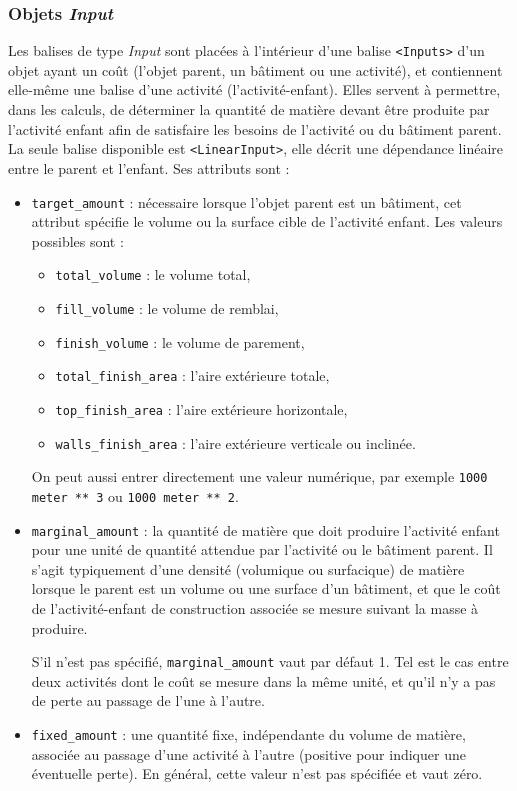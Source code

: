 \documentclass{article}
\begin{document}
\subsubsection{Objets \textit{Input}}
Les balises de type \textit{Input} sont placées à l'intérieur d'une balise \texttt{<Inputs>} d'un objet ayant un coût (l'objet parent, un bâtiment ou une activité), et contiennent elle-même une balise d'une activité (l'activité-enfant). Elles servent à permettre, dans les calculs, de déterminer la quantité de matière devant être produite par l'activité enfant afin de satisfaire les besoins de l'activité ou du bâtiment parent.
La seule balise disponible est \texttt{<LinearInput>}, elle décrit une dépendance linéaire entre le parent et l'enfant. Ses attributs sont :
\begin{itemize}
 \item \texttt{target\_amount} : nécessaire lorsque l'objet parent est un bâtiment, cet attribut spécifie le volume ou la surface cible de l'activité enfant. Les valeurs possibles sont :
 \begin{itemize}
  \item \texttt{total\_volume} : le volume total,
  \item \texttt{fill\_volume} : le volume de remblai,
  \item \texttt{finish\_volume} : le volume de parement,
  \item \texttt{total\_finish\_area} : l'aire extérieure totale,
  \item \texttt{top\_finish\_area} : l'aire extérieure horizontale,
  \item \texttt{walls\_finish\_area} : l'aire extérieure verticale ou inclinée.
 \end{itemize}
 On peut aussi entrer directement une valeur numérique, par exemple \texttt{1000 meter ** 3} ou \texttt{1000 meter ** 2}.

 
 \item \texttt{marginal\_amount} : la quantité de matière que doit produire l'activité enfant pour une unité de quantité attendue par l'activité ou le bâtiment parent. Il s'agit typiquement d'une densité (volumique ou surfacique) de matière lorsque le parent est un volume ou une surface d'un bâtiment, et que le coût de l'activité-enfant de construction associée se mesure suivant la masse à produire.
 
 S'il n'est pas spécifié, \texttt{marginal\_amount} vaut par défaut 1. Tel est le cas entre deux activités dont le coût se mesure dans la même unité, et qu'il n'y a pas de perte au passage de l'une à l'autre.
 
 \item \texttt{fixed\_amount} : une quantité fixe, indépendante du volume de matière, associée au passage d'une activité à l'autre (positive pour indiquer une éventuelle perte). En général, cette valeur n'est pas spécifiée et vaut zéro.
\end{itemize}
\end{document}

